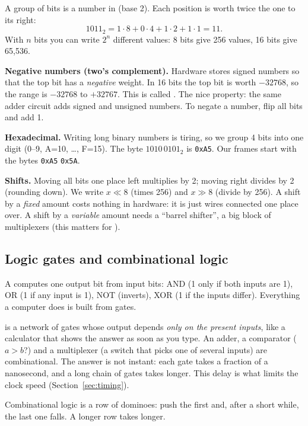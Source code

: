 \documentclass[11pt]{article}
\newcommand{\mods}[1]{\texttt{\detokenize{#1}}}   %
\newcommand{\hex}[1]{\texttt{0x#1}}
\begin{document}
A group of bits is a number in  (base 2). Each position is worth twice the one to its right:
\[
1011_2 = 1\cdot 8 + 0\cdot 4 + 1\cdot 2 + 1\cdot 1 = 11 .
\]
With $n$ bits you can write $2^n$ different values: 8 bits give 256 values, 16 bits give 65,536.

\textbf{Negative numbers (two's complement).} Hardware stores signed numbers so that the top bit has a \emph{negative} weight. In 16 bits the top bit is worth $-32768$, so the range is $-32768$ to $+32767$. This is called . The nice property: the same adder circuit adds signed and unsigned numbers. To negate a number, flip all bits and add 1.

\textbf{Hexadecimal.} Writing long binary numbers is tiring, so we group 4 bits into one  digit (0--9, A=10, \dots, F=15). The byte $1010\,0101_2$ is \hex{A5}. Our frames start with the bytes \hex{A5} \hex{5A}.

\textbf{Shifts.} Moving all bits one place left multiplies by 2; moving right divides by 2 (rounding down). We write $x \ll 8$ (times 256) and $x \gg 8$ (divide by 256). A shift by a \emph{fixed} amount costs nothing in hardware: it is just wires connected one place over. A shift by a \emph{variable} amount needs a ``barrel shifter'', a big block of multiplexers (this matters for \mods{v7_la}).

\subsection{Logic gates and combinational logic}
A  computes one output bit from input bits: AND (1 only if both inputs are 1), OR (1 if any input is 1), NOT (inverts), XOR (1 if the inputs differ). Everything a computer does is built from gates.

 is a network of gates whose output depends \emph{only on the present inputs}, like a calculator that shows the answer as soon as you type. An adder, a comparator ($a > b$?) and a multiplexer (a switch that picks one of several inputs) are combinational. The answer is not instant: each gate takes a fraction of a nanosecond, and a long chain of gates takes longer. This delay is what limits the clock speed (Section~\ref{sec:timing}).

\begin{analogy}
Combinational logic is a row of dominoes: push the first and, after a short while, the last one falls. A longer row takes longer.
\end{analogy}
\end{document}
